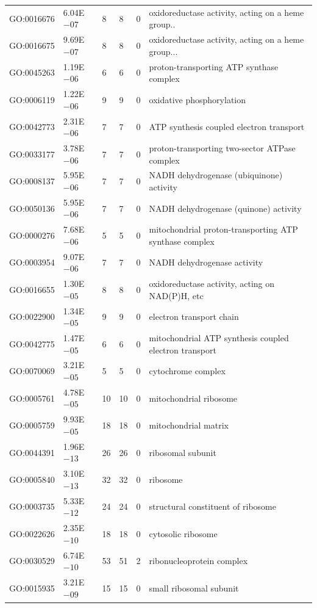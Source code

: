 \begin{appendices}
\begin{longtable}{| p{} | p{} |p{} | p{} |p{} | p{} |}
		GO:0016676 & 6.04E$-07$ & 8 & 8 & 0 & oxidoreductase activity, acting on a heme group.. \\ 
		GO:0016675 & 9.69E$-07$ & 8 & 8 & 0 & oxidoreductase activity, acting on a heme group... \\ 
		GO:0045263 & 1.19E$-06$ & 6 & 6 & 0 & proton-transporting ATP synthase complex \\ 
		GO:0006119 & 1.22E$-06$ & 9 & 9 & 0 & oxidative phosphorylation \\ 
		GO:0042773 & 2.31E$-06$ & 7 & 7 & 0 & ATP synthesis coupled electron transport \\ 
		GO:0033177 & 3.78E$-06$ & 7 & 7 & 0 & proton-transporting two-sector ATPase complex \\ 
		GO:0008137 & 5.95E$-06$ & 7 & 7 & 0 & NADH dehydrogenase (ubiquinone) activity \\ 
		GO:0050136 & 5.95E$-06$ & 7 & 7 & 0 & NADH dehydrogenase (quinone) activity \\ 
		GO:0000276 & 7.68E$-06$ & 5 & 5 & 0 & mitochondrial proton-transporting ATP synthase complex \\ 
		GO:0003954 & 9.07E$-06$ & 7 & 7 & 0 & NADH dehydrogenase activity \\ 
		GO:0016655 & 1.30E$-05$ & 8 & 8 & 0 & oxidoreductase activity, acting on NAD(P)H, etc \\ 
		GO:0022900 & 1.34E$-05$ & 9 & 9 & 0 & electron transport chain \\ 
		GO:0042775 & 1.47E$-05$ & 6 & 6 & 0 & mitochondrial ATP synthesis coupled electron transport \\ 
		GO:0070069 & 3.21E$-05$ & 5 & 5 & 0 & cytochrome complex \\ 
		GO:0005761 & 4.78E$-05$ & 10 & 10 & 0 & mitochondrial ribosome \\ 
		GO:0005759 & 9.93E$-05$ & 18 & 18 & 0 & mitochondrial matrix \\ 
		GO:0044391 & 1.96E$-13$ & 26 & 26 & 0 & ribosomal subunit \\ 
		GO:0005840 & 3.10E$-13$ & 32 & 32 & 0 & ribosome \\ 
		GO:0003735 & 5.33E$-12$ & 24 & 24 & 0 & structural constituent of ribosome \\ 
		GO:0022626 & 2.35E$-10$ & 18 & 18 & 0 & cytosolic ribosome \\ 
		GO:0030529 & 6.74E$-10$ & 53 & 51 & 2 & ribonucleoprotein complex \\ 
		GO:0015935 & 3.21E$-09$ & 15 & 15 & 0 & small ribosomal subunit \\ 

\end{longtable}
\end{appendices}
